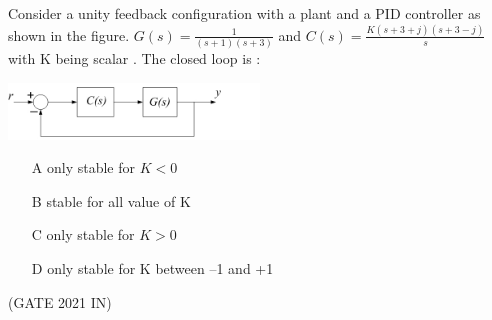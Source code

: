 \begin{enumerate}[label=\thechapter.\arabic*,ref=\thechapter.\theenumi]
\solution

\pagebreak
Consider a unity feedback configuration with a plant and a PID controller as shown in the figure. $G(s) = \frac{1}{(s+1)(s+3)} $ and $ C(s) = \frac{K(s+3+j)(s+3-j)}{s}$ with K being scalar . The closed loop is :
\begin{center}
\includegraphics[width=0.5\textwidth]{2021/IN/29/figs/figure1.jpg}
\end{center}
\begin{enumerate}
\item[A]only stable for $K < 0$
\item[B]stable for all value of K
\item[C]only stable for $K > 0$
\item[D]only stable for K between –1 and +1
\end{enumerate}
\hfill(GATE 2021 IN)\\
\solution

\pagebreak
\end{enumerate}
